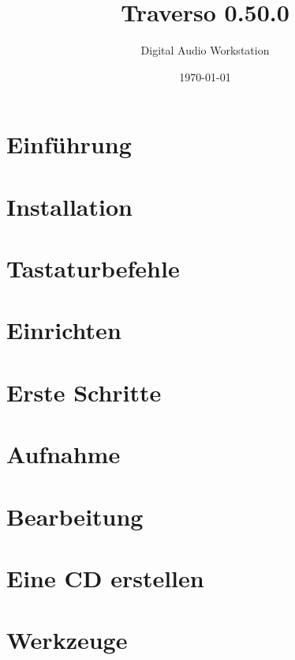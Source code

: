 \documentclass[a4paper,
               12pt,
               pdftex,
               twoside,
               smallheadings,
               headsepline,
               headinclude,
               DIV16,
               BCOR10mm,
               halfparskip
               ]{scrreprt}
\newcommand{\clearemptydoublepage}{\newpage\thispagestyle{empty}\cleardoublepage}
\begin{document}
\title{Traverso 0.50.0}
\author{Digital Audio Workstation}
\date{\today}

\begin{titlepage}
  
\end{titlepage}
  \clearemptydoublepage
  
  \clearemptydoublepage

\setcounter{page}{1}


\tableofcontents


\chapter{Einführung\label{sect_introduction}}

\chapter{Installation\label{sect_installation}}

\chapter{Tastaturbefehle\label{sect_keyactions}}

\chapter{Einrichten\label{sect_setup}}

\chapter{Erste Schritte\label{sect_quickstart}}

\chapter{Aufnahme\label{sect_recording}}

\chapter{Bearbeitung\label{sect_mixing}}

\chapter{Eine CD erstellen\label{sect_cdburning}}

\chapter{Werkzeuge\label{sect_tools}}

\end{document}

